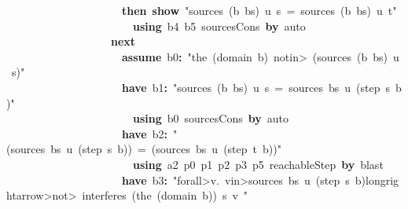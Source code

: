 \documentclass{article}
\newcommand{\syntaxKEYWORDA}[1]{\textcolor[rgb]{0.0,0.4,0.6}{\textbf{#1}}}
\newcommand{\syntaxKEYWORDC}[1]{\textcolor[rgb]{0.0,0.6,1.0}{\textbf{#1}}}
\newcommand{\syntaxLITERALA}[1]{\textcolor[rgb]{1.0,0.0,0.8}{#1}}
\newcommand{\syntaxOPERATOR}[1]{\textcolor[rgb]{0.0,0.0,0.0}{\textbf{#1}}}
\newcommand{\syntaxKEYWORDA}[1]{\textcolor[rgb]{0.0,0.4,0.6}{\textbf{#1}}}
\newcommand{\syntaxKEYWORDC}[1]{\textcolor[rgb]{0.0,0.6,1.0}{\textbf{#1}}}
\newcommand{\syntaxLITERALA}[1]{\textcolor[rgb]{1.0,0.0,0.8}{#1}}
\newcommand{\syntaxOPERATOR}[1]{\textcolor[rgb]{0.0,0.0,0.0}{\textbf{#1}}}
\newcommand{\syntaxKEYWORDA}[1]{\textcolor[rgb]{0.0,0.4,0.6}{\textbf{#1}}}
\newcommand{\syntaxKEYWORDC}[1]{\textcolor[rgb]{0.0,0.6,1.0}{\textbf{#1}}}
\newcommand{\syntaxLITERALA}[1]{\textcolor[rgb]{1.0,0.0,0.8}{#1}}
\newcommand{\syntaxOPERATOR}[1]{\textcolor[rgb]{0.0,0.0,0.0}{\textbf{#1}}}
\newcommand{\syntaxKEYWORDA}[1]{\textcolor[rgb]{0.0,0.4,0.6}{#1}}
\newcommand{\syntaxKEYWORDC}[1]{\textcolor[rgb]{0.0,0.6,1.0}{#1}}
\newcommand{\syntaxLITERALA}[1]{\textcolor[rgb]{1.0,0.0,0.8}{\textbf{#1}}}
\newcommand{\syntaxOPERATOR}[1]{\textcolor[rgb]{0.0,0.0,0.0}{#1}}
\newcommand{\syntaxKEYWORDA}[1]{\textcolor[rgb]{0.0,0.4,0.6}{\textbf{#1}}}
\newcommand{\syntaxKEYWORDC}[1]{\textcolor[rgb]{0.0,0.6,1.0}{\textbf{#1}}}
\newcommand{\syntaxLITERALA}[1]{\textcolor[rgb]{1.0,0.0,0.8}{#1}}
\newcommand{\syntaxOPERATOR}[1]{\textcolor[rgb]{0.0,0.0,0.0}{\textbf{#1}}}
\newcommand{\syntaxKEYWORDA}[1]{\textcolor[rgb]{0.0,0.4,0.6}{\textbf{#1}}}
\newcommand{\syntaxKEYWORDC}[1]{\textcolor[rgb]{0.0,0.6,1.0}{\textbf{#1}}}
\newcommand{\syntaxLITERALA}[1]{\textcolor[rgb]{1.0,0.0,0.8}{#1}}
\newcommand{\syntaxOPERATOR}[1]{\textcolor[rgb]{0.0,0.0,0.0}{\textbf{#1}}}
\begin{document}
{\ }{\ }{\ }{\ }{\ }{\ }{\ }{\ }{\ }{\ }{\ }{\ }{\ }{\ }{\ }{\ }{\ }{\ }{\ }{\ }{\ }\syntaxKEYWORDA{then}{\ }\syntaxKEYWORDC{show}{\ }\syntaxLITERALA{"sources{\ }(b{\ }\usebox{\hashbox}{\ }bs){\ }u{\ }s{\ }={\ }sources{\ }(b{\ }\usebox{\hashbox}{\ }bs){\ }u{\ }t"}\hspace*{\fill}\\
{\ }{\ }{\ }{\ }{\ }{\ }{\ }{\ }{\ }{\ }{\ }{\ }{\ }{\ }{\ }{\ }{\ }{\ }{\ }{\ }{\ }{\ }{\ }\syntaxKEYWORDA{using}{\ }b4{\ }b5{\ }sources\usebox{\underscorebox}Cons{\ }\syntaxKEYWORDA{by}{\ }auto\hspace*{\fill}\\
{\ }{\ }{\ }{\ }{\ }{\ }{\ }{\ }{\ }{\ }{\ }{\ }{\ }{\ }{\ }{\ }{\ }{\ }{\ }\syntaxKEYWORDA{next}\hspace*{\fill}\\
{\ }{\ }{\ }{\ }{\ }{\ }{\ }{\ }{\ }{\ }{\ }{\ }{\ }{\ }{\ }{\ }{\ }{\ }{\ }{\ }{\ }\syntaxKEYWORDC{assume}{\ }b0\syntaxOPERATOR{:}{\ }\syntaxLITERALA{"the{\ }(domain{\ }b){\ }\<notin>{\ }(sources{\ }(b{\ }\usebox{\hashbox}{\ }bs){\ }u{\ }s)"}\hspace*{\fill}\\
{\ }{\ }{\ }{\ }{\ }{\ }{\ }{\ }{\ }{\ }{\ }{\ }{\ }{\ }{\ }{\ }{\ }{\ }{\ }{\ }{\ }\syntaxKEYWORDA{have}{\ }b1\syntaxOPERATOR{:}{\ }\syntaxLITERALA{"sources{\ }(b{\ }\usebox{\hashbox}{\ }bs){\ }u{\ }s{\ }={\ }sources{\ }bs{\ }u{\ }(step{\ }s{\ }b)"}\hspace*{\fill}\\
{\ }{\ }{\ }{\ }{\ }{\ }{\ }{\ }{\ }{\ }{\ }{\ }{\ }{\ }{\ }{\ }{\ }{\ }{\ }{\ }{\ }{\ }{\ }\syntaxKEYWORDA{using}{\ }b0{\ }sources\usebox{\underscorebox}Cons{\ }\syntaxKEYWORDA{by}{\ }auto\hspace*{\fill}\\
{\ }{\ }{\ }{\ }{\ }{\ }{\ }{\ }{\ }{\ }{\ }{\ }{\ }{\ }{\ }{\ }{\ }{\ }{\ }{\ }{\ }\syntaxKEYWORDA{have}{\ }b2\syntaxOPERATOR{:}{\ }\syntaxLITERALA{"(sources{\ }bs{\ }u{\ }(step{\ }s{\ }b)){\ }={\ }(sources{\ }bs{\ }u{\ }(step{\ }t{\ }b))"}\hspace*{\fill}\\
{\ }{\ }{\ }{\ }{\ }{\ }{\ }{\ }{\ }{\ }{\ }{\ }{\ }{\ }{\ }{\ }{\ }{\ }{\ }{\ }{\ }{\ }{\ }\syntaxKEYWORDA{using}{\ }a2{\ }p0{\ }p1{\ }p2{\ }p3{\ }p5{\ }reachableStep{\ }\syntaxKEYWORDA{by}{\ }blast\hspace*{\fill}\\
{\ }{\ }{\ }{\ }{\ }{\ }{\ }{\ }{\ }{\ }{\ }{\ }{\ }{\ }{\ }{\ }{\ }{\ }{\ }{\ }{\ }\syntaxKEYWORDA{have}{\ }b3\syntaxOPERATOR{:}{\ }\syntaxLITERALA{"\<forall>v.{\ }v\<in>sources{\ }bs{\ }u{\ }(step{\ }s{\ }b)\<longrightarrow>\<not>{\ }interferes{\ }(the{\ }(domain{\ }b)){\ }s{\ }v{\ }"}\hspace*{\fill}\\
\end{document}
